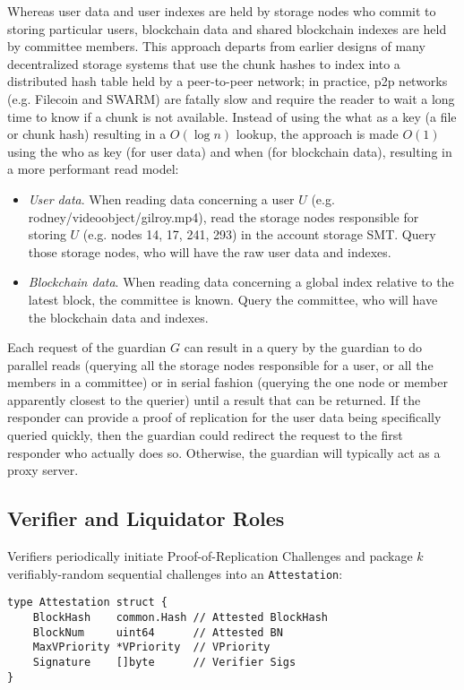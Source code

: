 \documentclass[journal]{IEEEtran}
\newcommand{\tx}[1]{\textsf{#1}}
\begin{document}
Whereas user data and user indexes are held by storage nodes who commit to storing particular users, blockchain data and shared blockchain indexes are held by committee members.  This approach departs from earlier designs of many decentralized storage systems that use the chunk hashes to index into a distributed hash table held by a peer-to-peer network; in practice, p2p networks (e.g. Filecoin and SWARM) are fatally slow and require the reader to wait a long time to know if a chunk is not available.  Instead of using the what as a key (a file or chunk hash) resulting in a $O(\log n)$ lookup, the approach is made $O(1)$ using the who as key (for user data) and when (for blockchain data), resulting in a more performant read model:
\begin{itemize}
    \item {\em User data}.  When reading data concerning a user $U$ (e.g. \tx{rodney/videoobject/gilroy.mp4}), read the storage nodes responsible for storing $U$ (e.g. nodes 14, 17, 241, 293) in the account storage SMT.  Query those storage nodes, who will have the raw user data and indexes.
    \item {\em Blockchain data}.  When reading data concerning a global index relative to the latest block, the committee is known.  Query the committee, who will have the blockchain data and indexes.
\end{itemize}

Each request of the guardian $G$ can result in a query by the guardian to do parallel reads (querying all the storage nodes responsible for a user, or all the members in a committee) or in serial fashion (querying the one node or member apparently closest to the querier) until a result that can be returned.  If the responder can provide a proof of replication for the user data being specifically queried quickly, then the guardian could  redirect the request to the first responder who actually does so.  Otherwise, the guardian will typically act as a proxy server.


\subsection{Verifier and Liquidator Roles}
\label{sec:verifierliquidator}

Verifiers periodically initiate Proof-of-Replication Challenges and package $k$ verifiably-random sequential challenges into an {\tt Attestation}:

\begin{footnotesize}
\begin{verbatim}
type Attestation struct {
    BlockHash    common.Hash // Attested BlockHash
    BlockNum     uint64      // Attested BN
    MaxVPriority *VPriority  // VPriority
    Signature    []byte      // Verifier Sigs
}
\end{verbatim}
\end{footnotesize}
\end{document}
